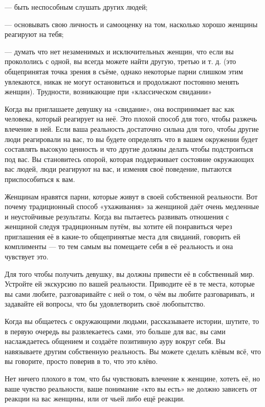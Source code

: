 --- быть неспособным слушать других людей;

--- основывать свою личность и самооценку на том, насколько хорошо женщины реагируют на тебя;

--- думать что нет незаменимых и исключительных женщин, что если вы прокололись с одной, вы всегда можете найти другую, третью и т. д. (это общепринятая точка зрения в съёме, однако некоторые парни слишком этим увлекаются, никак не могут остановиться и продолжают постоянно менять женщин).
Трудности, возникающие при «классическом свидании»

Когда вы приглашаете девушку на «свидание», она воспринимает вас как человека, который реагирует на неё. Это плохой способ для того, чтобы разжечь влечение в ней. Если ваша реальность достаточно сильна для того, чтобы другие люди реагировали на вас, то вы будете определять что в вашем окружении будет составлять высокую ценность и что другие должны делать чтобы подстроиться под вас. Вы становитесь опорой, которая поддерживает состояние окружающих вас людей, люди реагируют на вас, и изменяя своё поведение, пытаются приспособиться к вам.

Женщинам нравятся парни, которые живут в своей собственной реальности. Вот почему традиционный способ «ухаживания» за женщиной даёт очень медленные и неустойчивые результаты. Когда вы пытаетесь развивать отношения с женщиной следуя традиционным путём, вы хотите ей понравиться через приглашения её в какие-то общепринятые места для свиданий, говорить ей комплименты --- то тем самым вы помещаете себя в её реальность и она чувствует это.

Для того чтобы получить девушку, вы должны привести её в собственный мир. Устройте ей экскурсию по вашей реальности. Приводите её в те места, которые вы сами любите, разговаривайте с ней о том, о чём вы любите разговаривать, и задавайте ей вопросы, что бы удовлетворить своё любопытство.

Когда вы общаетесь с окружающими людьми, рассказываете истории, шутите, то в первую очередь вы развлекаетесь сами, это больше для вас, вы сами наслаждаетесь общением и создаёте позитивную ауру вокруг себя. Вы навязываете другим собственную реальность. Вы можете сделать клёвым всё, что вы говорите, просто поверив в то, что это клёво.

Нет ничего плохого в том, что бы чувствовать влечение к женщине, хотеть её, но ваше чувство реальности, ваше понимание «кто вы есть» не должно зависеть от реакции на вас женщины, или от чьей либо ещё реакции.

